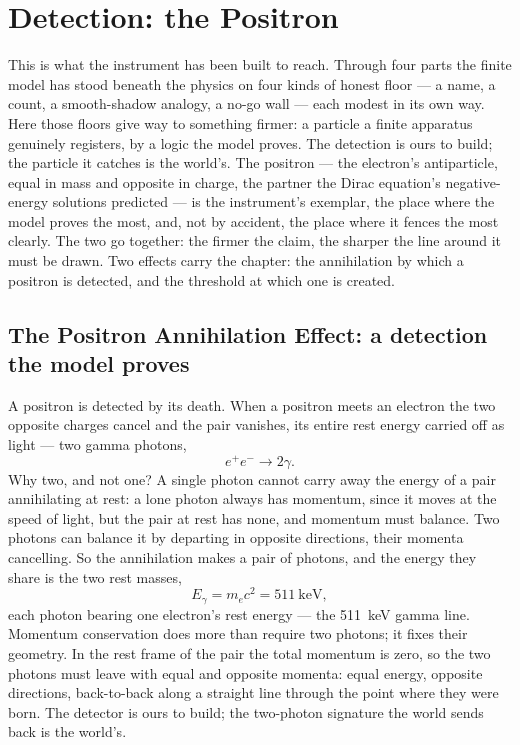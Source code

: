 \chapter{Detection: the Positron}
\label{chap:detection-the-positron}

This is what the instrument has been built to reach. Through four parts the finite model has stood
beneath the physics on four kinds of honest floor --- a name, a count, a smooth-shadow analogy, a no-go wall
--- each modest in its own way. Here those floors give way to something firmer: a particle a finite apparatus
genuinely registers, by a logic the model proves. The detection is ours to build; the particle it catches is
the world's. The positron --- the electron's antiparticle, equal in mass and opposite in charge, the partner
the Dirac equation's negative-energy solutions predicted --- is the instrument's exemplar, the place where the
model proves the most, and, not by accident, the place where it fences the most clearly. The two go together:
the firmer the claim, the sharper the line around it must be drawn. Two effects carry the chapter: the
annihilation by which a positron is detected, and the threshold at which one is created.

\section{The Positron Annihilation Effect: a detection the model proves}
\label{se:positron-annihilation}

A positron is detected by its death. When a positron meets an electron the two opposite charges cancel and the
pair vanishes, its entire rest energy carried off as light --- two gamma photons,
\begin{equation}
  e^+ e^- \longrightarrow 2\gamma .
\end{equation}
Why two, and not one? A single photon cannot carry away the energy of a pair annihilating at rest: a lone
photon always has momentum, since it moves at the speed of light, but the pair at rest has none, and momentum
must balance. Two photons can balance it by departing in opposite directions, their momenta cancelling. So the
annihilation makes a pair of photons, and the energy they share is the two rest masses,
\begin{equation}
  E_\gamma = m_e c^2 = 511~\mathrm{keV},
\end{equation}
each photon bearing one electron's rest energy --- the 511~keV gamma line. Momentum conservation does more than
require two photons; it fixes their geometry. In the rest frame of the pair the total momentum is zero, so the
two photons must leave with equal and opposite momenta: equal energy, opposite directions, back-to-back along a
straight line through the point where they were born. The detector is ours to build; the two-photon signature
the world sends back is the world's.

